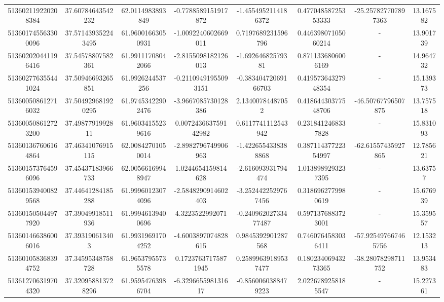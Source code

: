 \documentclass{article}
\begin{document}
\begin{landscape}
\begin{longtable}[c]{S[table-format=18.0]S[table-format=2.15]S[table-format=2.15]S[table-format=-2.17]S[table-format=-2.16]S[table-format=-2.16]S[table-format=-3.16]S[table-format=2.7]}
513602119220208384 & 37.60784643542232  & 62.0114983893849   & -0.7788589151917872   & -1.4554952114186372   & 0.47704858725353333 & -25.257827707897363 & 13.167582  \\
513601745563300096 & 37.571439352243495 & 61.96001663050931  & -1.0092240602669011   & 0.7197689231596796    & 0.44639807105060214 & {-}                  & 13.901739  \\
513602020441196416 & 37.54578807582361  & 61.99111708042066  & -2.8155098182126013   & -1.69264682579381     & 0.8711336806006169  & {-}                  & 14.964732  \\
513602776355441024 & 37.50946693265851  & 61.9926244537256   & -0.21109491955093151  & -0.38340472069166703  & 0.41957364327948354 & {-}                  & 15.139373  \\
513600508612716032 & 37.504929681920295 & 61.97453422902476  & -3.9667085730128386   & 2.13400784487052      & 0.41864430377548706 & -46.50767796507875  & 13.757518  \\
513600508612723200 & 37.4987791992811   & 61.96034155239616  & 0.007243663759142982  & 0.6117741112543942    & 0.2318412468337828  & {-}                  & 15.831093  \\
513601367606164864 & 37.46341076915115  & 62.00842701050014  & -2.8982796749906963   & -1.4226554338388868   & 0.38711437722354997 & -62.61557435927865  & 12.785621  \\
513601573764596096 & 37.45437183966733  & 62.00566169948947  & 1.0244654159814628    & -2.616093931794474    & 1.0138989293237395  & {-}                  & 13.63757   \\
513601539400829568 & 37.44641284185288  & 61.99960123074096  & -2.5848290914602403   & -3.2524422529767456   & 0.3186962779980619  & {-}                  & 15.676939  \\
513601505044977920 & 37.39049918511936  & 61.99946139400696  & 4.3223522992071       & -0.24096202733477487  & 0.5971376883723001  & {-}                  & 15.359557  \\
513601466386006016 & 37.393190613403    & 61.99319691704252  & -4.6003897074828615   & 0.9845392901287568    & 0.7460764583036411  & -57.925497667465756 & 12.153213  \\
513601058368394752 & 37.34595348758728  & 61.96537955735578  & 0.17237637175871945   & 0.25899639189537477   & 0.18023406943273365 & -38.28078298711752  & 13.953483  \\
513612706319704320 & 37.320958813728296 & 61.95954763986704  & -6.329665598131617    & -0.8560060388479223   & 2.0226789258185547  & {-}                  & 15.227361  \\

\end{longtable}
\end{landscape}
\end{document}
